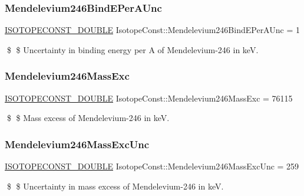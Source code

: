 \subsubsection{\texorpdfstring{Mendelevium246\+Bind\+E\+Per\+A\+Unc}{Mendelevium246BindEPerAUnc}}
{\footnotesize\ttfamily \mbox{\hyperlink{group___isotope_const-_macros_ga8f45a7272ce02c0b4c65c44636ed719a}{I\+S\+O\+T\+O\+P\+E\+C\+O\+N\+S\+T\+\_\+\+D\+O\+U\+B\+LE}} Isotope\+Const\+::\+Mendelevium246\+Bind\+E\+Per\+A\+Unc = 1}

\$ \$ Uncertainty in binding energy per A of Mendelevium-\/246 in keV. \mbox{\label{group___isotope_const-_mendelevium-_md246_gab0b41d566eefbb4dc37602e8b4147799}} 
\subsubsection{\texorpdfstring{Mendelevium246\+Mass\+Exc}{Mendelevium246MassExc}}
{\footnotesize\ttfamily \mbox{\hyperlink{group___isotope_const-_macros_ga8f45a7272ce02c0b4c65c44636ed719a}{I\+S\+O\+T\+O\+P\+E\+C\+O\+N\+S\+T\+\_\+\+D\+O\+U\+B\+LE}} Isotope\+Const\+::\+Mendelevium246\+Mass\+Exc = 76115}

\$ \$ Mass excess of Mendelevium-\/246 in keV. \mbox{\label{group___isotope_const-_mendelevium-_md246_ga9306c3bd23912fbd348cb4c86ea97920}} 
\subsubsection{\texorpdfstring{Mendelevium246\+Mass\+Exc\+Unc}{Mendelevium246MassExcUnc}}
{\footnotesize\ttfamily \mbox{\hyperlink{group___isotope_const-_macros_ga8f45a7272ce02c0b4c65c44636ed719a}{I\+S\+O\+T\+O\+P\+E\+C\+O\+N\+S\+T\+\_\+\+D\+O\+U\+B\+LE}} Isotope\+Const\+::\+Mendelevium246\+Mass\+Exc\+Unc = 259}

\$ \$ Uncertainty in mass excess of Mendelevium-\/246 in keV. \mbox{\label{group___isotope_const-_mendelevium-_md246_ga9697254c260272365214b05225a0cc5a}} 
